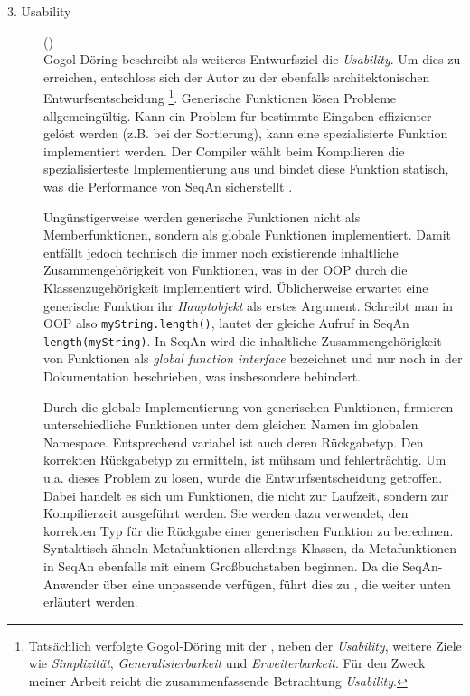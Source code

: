 \begin{description}
  \item[3. Usability]\label{sec:lie-usability} () \\
  Gogol-Döring beschreibt als weiteres Entwurfsziel die \textit{Usability}. Um dies zu erreichen, entschloss sich der Autor zu der ebenfalls architektonischen Entwurfsentscheidung \footnote{Tatsächlich verfolgte Gogol-Döring mit der , neben der \textit{Usability}, weitere Ziele wie \textit{Simplizität}, \textit{Generalisierbarkeit} und \textit{Erweiterbarkeit}. Für den Zweck meiner Arbeit reicht die zusammenfassende Betrachtung \textit{Usability}.}. Generische Funktionen lösen Probleme allgemeingültig. Kann ein Problem für bestimmte Eingaben effizienter gelöst werden (z.B. bei der Sortierung), kann eine spezialisierte Funktion implementiert werden. Der Compiler wählt beim Kompilieren die spezialisierteste Implementierung aus und bindet diese Funktion statisch, was die Performance von SeqAn sicherstellt \citep[Details siehe][]{GogolDoring:2009vz}.
  
  Ungünstigerweise werden generische Funktionen nicht als Memberfunktionen, sondern als globale Funktionen implementiert. Damit entfällt jedoch technisch die immer noch existierende inhaltliche Zusammengehörigkeit von Funktionen, was in der OOP durch die Klassenzugehörigkeit implementiert wird. Üblicherweise erwartet eine generische Funktion ihr \textit{Hauptobjekt} als erstes Argument. Schreibt man in OOP also \texttt{myString.length()}, lautet der gleiche Aufruf in SeqAn \texttt{length(myString)}. In SeqAn wird die inhaltliche Zusammengehörigkeit von Funktionen als \textit{global function interface} bezeichnet und nur noch in der Dokumentation beschrieben, was insbesondere  behindert.
  
  Durch die globale Implementierung von generischen Funktionen, firmieren unterschiedliche Funktionen unter dem gleichen Namen im globalen Namespace. Entsprechend variabel ist auch deren Rückgabetyp. Den korrekten Rückgabetyp zu ermitteln, ist mühsam und fehlerträchtig. Um u.a. dieses Problem zu lösen, wurde die Entwurfsentscheidung  getroffen. Dabei handelt es sich um Funktionen, die nicht zur Laufzeit, sondern zur Kompilierzeit ausgeführt werden. Sie werden dazu verwendet, den korrekten Typ für die Rückgabe einer generischen Funktion zu berechnen. Syntaktisch ähneln Metafunktionen allerdings Klassen, da Metafunktionen in SeqAn ebenfalls mit einem Großbuchstaben beginnen. Da die SeqAn-Anwender über eine unpassende  verfügen, führt dies zu , die weiter unten erläutert werden.
  

\end{description}
